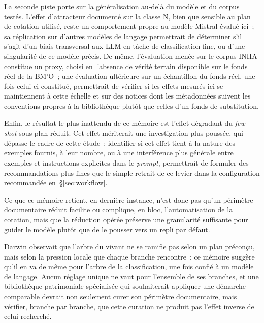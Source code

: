 La seconde piste porte sur la généralisation au-delà du modèle et du corpus testés. L'effet d'attracteur documenté sur la classe N, bien que sensible au plan de cotation utilisé, reste un comportement propre au modèle Mistral évalué ici~; sa réplication sur d'autres modèles de langage permettrait de déterminer s'il s'agit d'un biais transversal aux LLM en tâche de classification fine, ou d'une singularité de ce modèle précis. De même, l'évaluation menée sur le corpus INHA constitue un proxy, choisi en l'absence de vérité terrain disponible sur le fonds réel de la BM'O~; une évaluation ultérieure sur un échantillon du fonds réel, une fois celui-ci constitué, permettrait de vérifier si les effets mesurés ici se maintiennent à cette échelle et sur des notices dont les métadonnées suivent les conventions propres à la bibliothèque plutôt que celles d'un fonds de substitution.

Enfin, le résultat le plus inattendu de ce mémoire est l'effet dégradant du \textit{few-shot} sous plan réduit. Cet effet mériterait une investigation plus poussée, qui dépasse le cadre de cette étude~: identifier si cet effet tient à la nature des exemples fournis, à leur nombre, ou à une interférence plus générale entre exemples et instructions explicites dans le \textit{prompt}, permettrait de formuler des recommandations plus fines que le simple retrait de ce levier dans la configuration recommandée en~\S\ref{sec:workflow}.

Ce que ce mémoire retient, en dernière instance, n'est donc pas qu'un périmètre documentaire réduit facilite ou complique, en bloc, l'automatisation de la cotation, mais que la réduction opérée préserve une granularité suffisante pour guider le modèle plutôt que de le pousser vers un repli par défaut.

Darwin observait que l'arbre du vivant ne se ramifie pas selon un plan préconçu, mais selon la pression locale que chaque branche rencontre~; ce mémoire suggère qu'il en va de même pour l'arbre de la classification, une fois confié à un modèle de langage. Aucun réglage unique ne vaut pour l'ensemble de ses branches, et une bibliothèque patrimoniale spécialisée qui souhaiterait appliquer une démarche comparable devrait non seulement curer son périmètre documentaire, mais vérifier, branche par branche, que cette curation ne produit pas l'effet inverse de celui recherché.